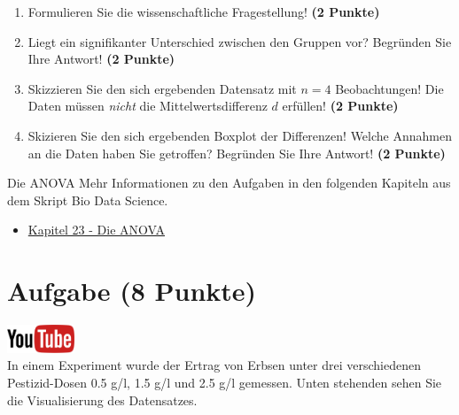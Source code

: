 \documentclass[a4paper, 9pt]{scrartcl}\usepackage[]{graphicx}\usepackage[]{xcolor}
\begin{document}
\begin{enumerate}
  \item Formulieren Sie die wissenschaftliche Fragestellung! \textbf{(2
Punkte)}
\item Liegt ein signifikanter Unterschied zwischen den Gruppen vor?
  Begr{\"u}nden Sie Ihre Antwort! \textbf{(2 Punkte)}
\item Skizzieren Sie den sich ergebenden Datensatz mit $n = 4$
  Beobachtungen! Die Daten m{\"u}ssen \textit{nicht} die Mittelwertsdifferenz
  $d$ erf{\"u}llen! \textbf{(2 Punkte)} 
\item Skizieren Sie den sich ergebenden Boxplot der Differenzen! Welche Annahmen an die Daten haben Sie getroffen? Begr{\"u}nden Sie Ihre Antwort! \textbf{(2 Punkte)} 
\end{enumerate}
 
\clearpage
\begin{graybox}{Die ANOVA}
Mehr Informationen zu den Aufgaben in den folgenden Kapiteln aus dem Skript Bio Data Science.
  \begin{itemize}
  \item \href{https://jkruppa.github.io/stat-tests-anova.html}{Kapitel 23 - Die ANOVA}
  \end{itemize}
\end{graybox}
\clearpage

\section{Aufgabe \hfill (8 Punkte)}

\hfill\href{https://youtu.be/Q7xtQJoOmQI}{\includegraphics[width =
  2cm]{img/youtube}}\\[1Ex]

In einem Experiment wurde der Ertrag von Erbsen unter drei verschiedenen
Pestizid-Dosen 0.5 g/l, 1.5 g/l und 2.5 g/l gemessen. Unten stehenden sehen
Sie die Visualisierung des Datensatzes.
\end{document}
